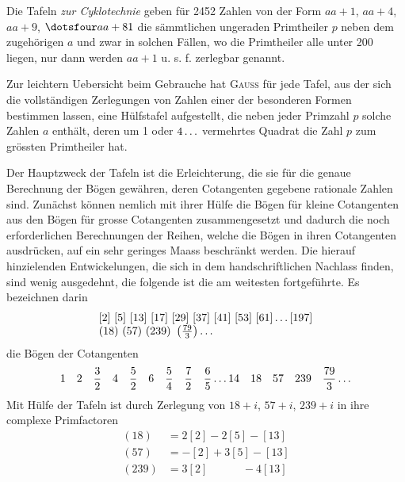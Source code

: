 \par Die Tafeln \textit{zur Cyklotechnie} geben für 2452 Zahlen von der Form $aa+1$, $aa+4$, $aa+9$, $\dotsfour aa+81$ die sämmtlichen ungeraden Primtheiler $p$ neben dem zugehörigen $a$ und zwar in solchen Fällen, wo die Primtheiler alle unter 200 liegen, nur dann werden $aa+1$ u. s. f. zerlegbar genannt.
\par Zur leichtern Uebersicht beim Gebrauche hat \textsc{Gauss} für jede Tafel, aus der sich die vollständigen Zerlegungen von Zahlen einer der besonderen Formen bestimmen lassen, eine Hülfstafel aufgestellt, die neben jeder Primzahl $p$ solche Zahlen $a$ enthält, deren um 1 oder $4\mathinner{.\,.\,.}$ vermehrtes Quadrat die Zahl $p$ zum grössten Primtheiler hat.
\par Der Hauptzweck der Tafeln ist die Erleichterung, die sie für die genaue Berechnung der Bögen gewähren, deren Cotangenten gegebene rationale Zahlen sind. Zunächst können nemlich mit ihrer Hülfe die Bögen für kleine Cotangenten aus den Bögen für grosse Cotangenten zusammengesetzt und dadurch die noch erforderlichen Berechnungen der Reihen, welche die Bögen in ihren Cotangenten ausdrücken, auf ein sehr geringes Maass beschränkt werden. Die hierauf hinzielenden Entwickelungen, die sich in dem handschriftlichen Nachlass finden, sind wenig ausgedehnt, die folgende ist die am weitesten fortgeführte. Es bezeichnen darin
\[
\begin{array}{l}
[2]\ [5]\ [13]\ [17]\ [29]\ [37]\ [41]\ [53]\ [61]\mathinner{.\,.\,.}[197]\\
(18)\ (57)\ (239)\ \left(\frac{79}{3}\right)\mathinner{.\,.\,.}
\end{array}
\]
die Bögen der Cotangenten
\[
1\quad2\quad\frac{3}{2}\quad4\quad\frac{5}{2}\quad6\quad\frac{5}{4}\quad\frac{7}{2}\quad\frac{6}{5}\mathinner{.\,.\,.}14\quad18\quad57\quad239\quad\frac{79}{3}\mathinner{.\,.\,.}
\]
Mit Hülfe der Tafeln ist durch Zerlegung von $18+i$, $57+i$, $239+i$ in ihre complexe Primfactoren
\[
\begin{aligned}
(18)&=2[2]-2[5]-[13]\\
(57)&=-[2]+3[5]-[13]\\
(239)&=3[2]\phantom{-2[5]}-4[13]
\end{aligned}
\]
